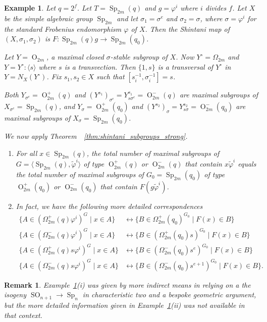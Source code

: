 \documentclass[11pt]{article}
\numberwithin{equation}{section}
\theoremstyle{shdefinition}
\newtheorem{remark}[definition]{Remark}
\newtheorem{example}[definition]{Example}
\theoremstyle{shplain}
\newcommand{\p}{\varphi}
\renewcommand{\wp}{\widetilde{\varphi}}
\newcommand{\s}{\sigma}
\newcommand{\<}{\langle}
\renewcommand{\>}{\rangle}
\renewcommand{\:}{\colon}
\newcommand{\Sp}{\operatorname{Sp}}
\newcommand{\SO}{\operatorname{SO}}
\renewcommand{\O}{\operatorname{O}}
\begin{document}
\begin{example} \label{ex:symplectic}
Let $q=2^f$. Let $T = \Sp_{2m}(q)$ and $g = \p^i$ where $i$ divides $f$. Let $X$ be the simple algebraic group $\Sp_{2m}$ and let $\s_1 = \s^e$ and $\s_2 = \s$, where $\s = \p^i$ for the standard Frobenius endomorphism $\p$ of $X$. Then the Shintani map of $(X,\s_1,\s_2)$ is $F\:\Sp_{2m}(q)g \to \Sp_{2m}(q_0)$. 

Let $Y = \O_{2m}$, a maximal closed $\s$-stable subgroup of $X$. Now $Y^\circ = \Omega_{2m}$ and $Y = Y^\circ{:}\<s\>$ where $s$ is a transvection. Then $\{ 1, s \}$ is a transversal of $Y^\circ$ in $Y = N_X(Y^\circ)$. Fix $s_1,s_2 \in X$ such that $[s_i^{-1},\s_i^{-1}] = s$.  

Both $Y_{\s^e} = \O^+_{2m}(q)$ and $(Y^{s_1})_{\s^e} = Y_{s\s^e}^{s_1} = \O^-_{2m}(q)$ are maximal subgroups of $X_{\s^e} = \Sp_{2m}(q)$, and $Y_\s = \O^+_{2m}(q_0)$ and $(Y^{s_2})_{\s} = Y_{s\s}^{s_2} = \O^-_{2m}(q_0)$ are maximal subgroups of $X_{\s} = \Sp_{2m}(q_0)$.

We now apply Theorem~~\ref{thm:shintani_subgroups_strong}.
\begin{enumerate}
\item For all $x \in \Sp_{2m}(q)$, the total number of maximal subgroups of $G = \<  \Sp_{2m}(q), \wp^i \>$ of type $\O^+_{2m}(q)$ or $\O^-_{2m}(q)$ that contain $x\wp^i$ equals the total number of maximal subgroups of $G_0 = \Sp_{2m}(q_0)$ of type $\O^+_{2m}(q_0)$ or $\O^-_{2m}(q_0)$ that contain $F(g\wp^i)$.
\item In fact, we have the following more detailed correspondences
\begin{align*}
\{ A \in (\Omega^+_{2m}(q)\p^i)^G  \mid x \in A \} &\longleftrightarrow \{ B \in  \Omega^+_{2m}(q_0)^{G_0}         \mid F(x) \in B \}  \\ 
\{ A \in (\Omega^-_{2m}(q)\p^i)^G  \mid x \in A \} &\longleftrightarrow \{ B \in (\Omega^+_{2m}(q_ 0)s)^{G_0}      \mid F(x) \in B \}  \\          
\{ A \in (\Omega^+_{2m}(q)s\p^i)^G \mid x \in A \} &\longleftrightarrow \{ B \in (\Omega^-_{2m}(q_0)s^e)^{G_0}     \mid F(x) \in B \}  \\        
\{ A \in (\Omega^-_{2m}(q)s\p^i)^G \mid x \in A \} &\longleftrightarrow \{ B \in (\Omega^-_{2m}(q_0)s^{e+1})^{G_0} \mid F(x) \in B \}. 
\end{align*}
\end{enumerate}
\end{example} 

\begin{remark} \label{rem:symplectic}
Example~\ref{ex:symplectic}(i) was given by more indirect means in \cite[Section~2.2.3]{ref:Harper17} relying on a the isogeny $\SO_{n+1} \to \Sp_n$ in characteristic two and a bespoke geometric argument, but the more detailed information given in Example~\ref{ex:symplectic}(ii) was not available in that context.
\end{remark}
\end{document}
